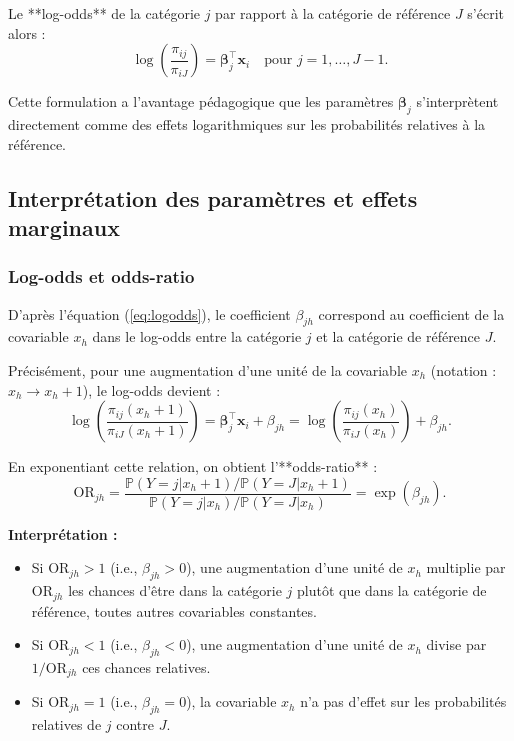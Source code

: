\documentclass[12pt,a4paper]{article}
\begin{document}
Le **log-odds** de la catégorie $j$ par rapport à la catégorie de référence $J$ s'écrit alors :
\begin{equation}\label{eq:logodds}
\log\left(\frac{\pi_{ij}}{\pi_{iJ}}\right) = \boldsymbol{\beta}_j^\top \mathbf{x}_i \quad \text{pour } j=1,\dots,J-1.
\end{equation}

Cette formulation a l'avantage pédagogique que les paramètres $\boldsymbol{\beta}_j$ s'interprètent directement comme des effets logarithmiques sur les probabilités relatives à la référence.

\subsection{Interprétation des paramètres et effets marginaux}

\subsubsection{Log-odds et odds-ratio}

D'après l'équation (\ref{eq:logodds}), le coefficient $\beta_{jh}$ correspond au coefficient de la covariable $x_h$ dans le log-odds entre la catégorie $j$ et la catégorie de référence $J$.

Précisément, pour une augmentation d'une unité de la covariable $x_h$ (notation : $x_h \to x_h + 1$), le log-odds devient :
\begin{equation}
\log\left(\frac{\pi_{ij}(x_h+1)}{\pi_{iJ}(x_h+1)}\right) = \boldsymbol{\beta}_j^\top \mathbf{x}_i + \beta_{jh} = \log\left(\frac{\pi_{ij}(x_h)}{\pi_{iJ}(x_h)}\right) + \beta_{jh}.
\end{equation}

En exponentiant cette relation, on obtient l'**odds-ratio** :
\begin{equation}\label{eq:oddsratio}
\text{OR}_{jh} = \frac{\mathbb{P}(Y=j | x_h+1) / \mathbb{P}(Y=J | x_h+1)}{\mathbb{P}(Y=j | x_h) / \mathbb{P}(Y=J | x_h)} = \exp(\beta_{jh}).
\end{equation}

\textbf{Interprétation :}
\begin{itemize}
    \item Si $\text{OR}_{jh} > 1$ (i.e., $\beta_{jh} > 0$), une augmentation d'une unité de $x_h$ multiplie par $\text{OR}_{jh}$ les chances d'être dans la catégorie $j$ plutôt que dans la catégorie de référence, toutes autres covariables constantes.
    \item Si $\text{OR}_{jh} < 1$ (i.e., $\beta_{jh} < 0$), une augmentation d'une unité de $x_h$ divise par $1/\text{OR}_{jh}$ ces chances relatives.
    \item Si $\text{OR}_{jh} = 1$ (i.e., $\beta_{jh} = 0$), la covariable $x_h$ n'a pas d'effet sur les probabilités relatives de $j$ contre $J$.
\end{itemize}
\end{document}
